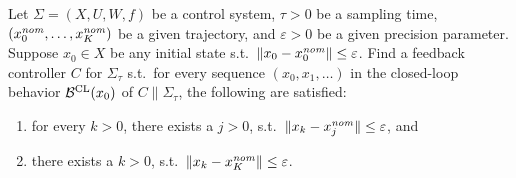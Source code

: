 \begin{problem}\label{prob:tracking}
	Let $\Sigma=(X,U,W,f)$ be a control system, $\tau>0$ be a sampling time, $(x_0^{\mathit{nom}},\ldots,x_K^{\mathit{nom}})$ be a given trajectory, and $\varepsilon>0$ be a given precision parameter.
	Suppose $x_0\in X$ be any initial state s.t.\ $\| x_0-x_0^{\mathit{nom}} \|\leq \varepsilon$.
	Find a feedback controller $C$ for $\Sigma_\tau$ s.t.\ for every sequence $(x_0,x_1,\ldots)$ in the closed-loop behavior $\mathcal{B}^{\mathrm{CL}}(x_0)$ of $C \parallel \Sigma_\tau$, the following are satisfied:
	\begin{enumerate}
		\item for every $k > 0$, there exists a $j>0$, s.t.\ $\| x_k-x_j^{\mathit{nom}} \| \leq \varepsilon$, and
		\item there exists a $k>0$, s.t.\ $\| x_k-x_K^{\mathit{nom}} \|\leq \varepsilon$.
	\end{enumerate} 
\end{problem}


%
%
%
